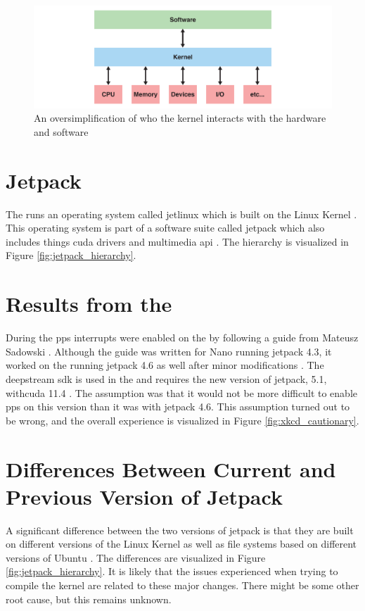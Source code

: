 \begin{figure}[H]
    \centering
    \includegraphics[width=\textwidth]{figures/kernel.pdf}
    \caption{An oversimplification of who the kernel interacts with the hardware and software}
    \label{fig:kernel_visualization}
\end{figure}

\section{Jetpack}
The \jx runs an operating system called \gls{jetlinux} which is built on the Linux Kernel \cite{JetsonLinux352023}.
This operating system is part of a software suite called \gls{jetpack} which also includes things \gls{cuda} drivers and multimedia \gls{api} \cite{nvidiaJetPackSDK2023}.
The hierarchy is visualized in Figure \ref{fig:jetpack_hierarchy}.

\section{Results from the \preproject}
During the \preproject \gls{pps} interrupts were enabled on the \jx by following a guide from Mateusz Sadowski \cite{sadowskiEnablingPPSJetson2020} \cite[26]{martensPortableSensorRig2022}.
Although the guide was written for \jetson Nano running \gls{jetpack} 4.3, it worked on the \jx running \gls{jetpack} 4.6 as well after minor modifications \cite{sadowskiEnablingPPSJetson2020} \cite[26]{martensPortableSensorRig2022}.
The \gls{deepstream} \gls{sdk} is used in the \master and requires the new version of \gls{jetpack}, 5.1, with\gls{cuda} 11.4 \cite{nvidiaDeepStreamSDKGet2019}.
The assumption was that it would not be more difficult to enable \gls{pps} on this version than it was with \gls{jetpack} 4.6.
This assumption turned out to be wrong, and the overall experience is visualized in Figure \ref{fig:xkcd_cautionary}.

\section{Differences Between Current and Previous Version of Jetpack}
A significant difference between the two versions of \gls{jetpack} is that they are built on different versions of the Linux Kernel as well as file systems based on different versions of Ubuntu \cite{nvidiaJetPackSDK2022} \cite{nvidiaJetPackSDK2023}.
The differences are visualized in Figure \ref{fig:jetpack_hierarchy}.
It is likely that the issues experienced when trying to compile the kernel are related to these major changes.
There might be some other root cause, but this remains unknown.

